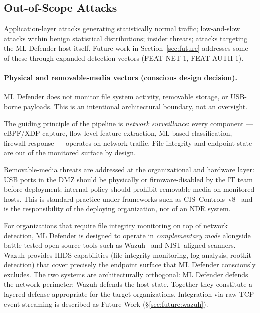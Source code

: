 \documentclass[11pt,a4paper]{article}
\begin{document}
    \subsection{Out-of-Scope Attacks}
    \label{sec:threatmodel:outofscope}

    Application-layer attacks generating statistically normal traffic; low-and-slow
    attacks within benign statistical distributions; insider threats; attacks
    targeting the ML Defender host itself. Future work in
    Section~\ref{sec:future} addresses some of these through expanded detection
    vectors (FEAT-NET-1, FEAT-AUTH-1).

    \paragraph{Physical and removable-media vectors (conscious design decision).}
    ML Defender does not monitor file system activity, removable storage, or
    USB-borne payloads. This is an intentional architectural boundary, not an
    oversight.

    The guiding principle of the pipeline is \emph{network surveillance}: every
    component --- eBPF/XDP capture, flow-level feature extraction, ML-based
    classification, firewall response --- operates on network traffic. File
    integrity and endpoint state are out of the monitored surface by design.

    Removable-media threats are addressed at the organizational and hardware
    layer: USB ports in the DMZ should be physically or firmware-disabled by the
    IT team before deployment; internal policy should prohibit removable media on
    monitored hosts. This is standard practice under frameworks such as
    CIS~Controls~v8~\cite{ciscontrols2021} and is the responsibility of the
    deploying organization, not of an NDR system.

    For organizations that require file integrity monitoring on top of network
    detection, ML Defender is designed to operate in \emph{complementary mode}
    alongside battle-tested open-source tools such as Wazuh~\cite{wazuh2024} and
    NIST-aligned scanners. Wazuh provides HIDS capabilities (file integrity
    monitoring, log analysis, rootkit detection) that cover precisely the
    endpoint surface that ML Defender consciously excludes. The two systems are
    architecturally orthogonal: ML Defender defends the network perimeter; Wazuh
    defends the host state. Together they constitute a layered defense appropriate
    for the target organizations. Integration via raw TCP event streaming is
    described as Future Work (\S\ref{sec:future:wazuh}).
\end{document}
